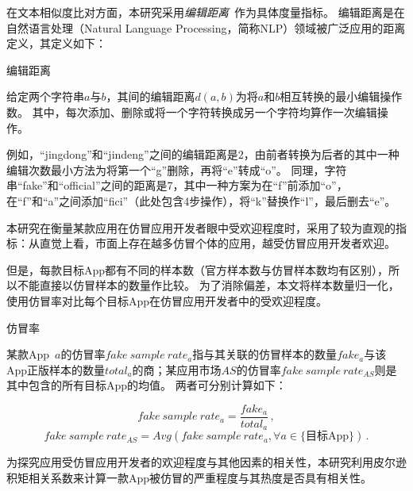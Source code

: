 在文本相似度比对方面，本研究采用\textit{编辑距离}~\cite{levenshtein1966binary}作为具体度量指标。
编辑距离是在自然语言处理（Natural Language Processing，简称NLP）领域被广泛应用的距离定义，其定义如下：

\begin{Def}
    编辑距离

    给定两个字符串$a$与$b$，其间的编辑距离$d(a, b)$为将$a$和$b$相互转换的最小编辑操作数。
    其中，每次添加、删除或将一个字符转换成另一个字符均算作一次编辑操作。
\end{Def}

例如，``jingdong''和``jindeng''之间的编辑距离是2，由前者转换为后者的其中一种编辑次数最小方法为将第一个``g''删除，再将``e''转成``o''。
同理，字符串``fake''和``official''之间的距离是7，其中一种方案为在``f''前添加``o''，在``f''和``a''之间添加``fici''（此处包含4步操作），将``k''替换作``l''，最后删去``e''。

\vspace{0.5mm}
\vspace{0.5mm}

本研究在衡量某款应用在仿冒应用开发者眼中受欢迎程度时，采用了较为直观的指标：从直觉上看，市面上存在越多仿冒个体的应用，越受仿冒应用开发者欢迎。

但是，每款目标App都有不同的样本数（官方样本数与仿冒样本数均有区别），所以不能直接以仿冒样本的数量作比较。
为了消除偏差，本文将样本数量归一化，使用仿冒率对比每个目标App在仿冒应用开发者中的受欢迎程度。

\begin{Def}
    仿冒率

    某款App~$a$的仿冒率$fake~sample~rate_a$指与其关联的仿冒样本的数量$fake_a$与该App正版样本的数量$total_a$的商；某应用市场$AS$的仿冒率$fake~sample~rate_{AS}$则是其中包含的所有目标App的均值。
    两者可分别计算如下：
\end{Def}

\begin{equation}
    fake~sample~rate_a = \frac{fake_a}{total_a} \,,
    \label{equ:fake_rate_app}
\end{equation}
\begin{equation}
    fake~sample~rate_{AS} = Avg(fake~sample~rate_a, \forall a \in \text{\{目标App\}}) \,.
    \label{equ:fake_rate_mkt}
\end{equation}

为探究应用受仿冒应用开发者的欢迎程度与其他因素的相关性，本研究利用皮尔逊积矩相关系数来计算一款App被仿冒的严重程度与其热度是否具有相关性。

